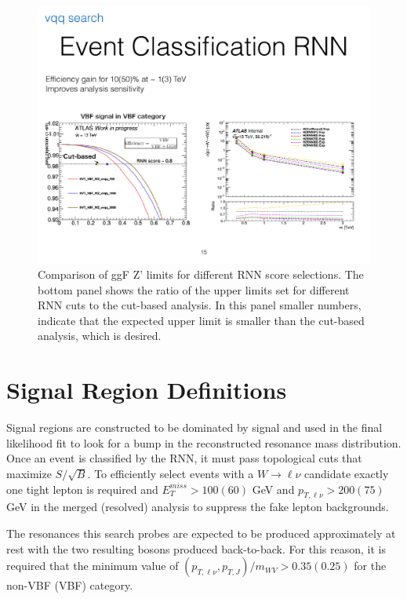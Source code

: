 \begin{figure}[h!]
  \centering
  \includegraphics[width=\hsize]{figures/Analysis/rnn_limits.pdf}
  \caption{Comparison of ggF Z' limits for different RNN score selections. The bottom panel shows the ratio of the upper limits set for different RNN cuts to the cut-based analysis. In this panel smaller numbers, indicate that the expected upper limit is smaller than the cut-based analysis, which is desired.} 
  \label{fig:rnn_limits}
\end{figure}
\FloatBarrier

\section{Signal Region Definitions}
\label{Signal Region Definitions}
Signal regions are constructed to be dominated by signal and used in the final likelihood fit to look for a bump in the reconstructed resonance mass distribution. Once an event is classified by the RNN, it must pass topological cuts that maximize $S/\sqrt{B}$. To efficiently select events with a $W\rightarrow \ell \nu$ candidate exactly one tight lepton is required and $E_{T}^{miss} > 100(60)$ GeV and $p_{T,\ell\nu} > 200(75)$ GeV in the merged (resolved) analysis to suppress the fake lepton backgrounds. 

The resonances this search probes are expected to be produced approximately at rest with the two resulting bosons produced back-to-back. For this reason, it is required that the minimum value of $(p_{T, \ell \nu}, p_{T,J})/m_{WV} > 0.35(0.25)$ for the non-VBF (VBF) category. 

